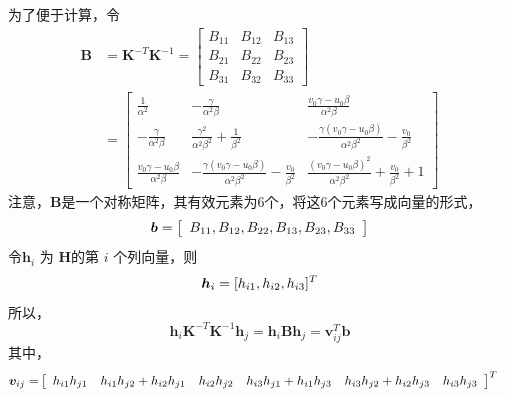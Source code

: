 为了便于计算，令
\begin{equation}
\label{eqn:2.55}
\begin{aligned}
\bm{B} &= \bm{K}^{-T}\bm{K}^{-1}
=\left[
\begin{array}{ccc}
B_{11} & B_{12} & B_{13} \\
B_{21} & B_{22} & B_{23} \\
B_{31} & B_{32} & B_{33}
\end{array}
\right]  \\
&=\left[
\begin{array}{ccc}
\frac{1}{\alpha^2} & -\frac{\gamma}{\alpha^2\beta} & \frac{v_0\gamma-u_0\beta}{\alpha^2\beta} \\
-\frac{\gamma}{\alpha^2\beta} & \frac{\gamma^2}{\alpha^2\beta^2}+\frac{1}{\beta^2} & -\frac{\gamma(v_0\gamma-u_0\beta)}{\alpha^2\beta^2}-\frac{v_0}{\beta^2} \\
\frac{v_0\gamma-u_0\beta}{\alpha^2\beta} & -\frac{\gamma(v_0\gamma-u_0\beta)}{\alpha^2\beta^2}-\frac{v_0}{\beta^2} & \frac{(v_0\gamma-u_0\beta)^2}{\alpha^2\beta^2}+\frac{v_0}{\beta^2}+1
\end{array}
\right]
\end{aligned}
\end{equation}
注意，$\bm{B}$是一个对称矩阵，其有效元素为6个，将这6个元素写成向量的形式，
\begin{equation}
\label{eqn:2.56}
\setlength{\abovedisplayskip}{6pt}
\setlength{\belowdisplayskip}{6pt}
\bm{b} =\left[\begin{array}{ccc}B_{11} ,B_{12} , B_{22},B_{13},B_{23},B_{33}\end{array}\right]
\end{equation}
令$\bm{h}_i $ 为 $\bm{H} $的第 $i$  个列向量，则 
\begin{equation}
\label{eqn:2.57}
\setlength{\abovedisplayskip}{6pt}
\setlength{\belowdisplayskip}{6pt}
\bm{h}_i = [h_{i1},h_{i2},h_{i3}]^T
\end{equation}
所以，
\begin{equation}
\label{eqn:2.58}
\bm{h}_i \bm{K}^{-T}\bm{K}^{-1} \bm{h}_j = \bm{h}_i \bm{B} \bm{h}_j = \bm{v}_{ij}^T \bm{b}
\end{equation}
其中，
\[
\setlength{\abovedisplayskip}{6pt}
\setlength{\belowdisplayskip}{6pt}
\begin{aligned}
\bm{v}_{ij} = 
& \left[ \begin{array}{cccccc} 
h_{i1}h_{j1} & h_{i1}h_{j2}+h_{i2}h_{j1} & h_{i2}h_{j2} & h_{i3}h_{j1}+h_{i1}h_{j3} & h_{i3}h_{j2}+h_{i2}h_{j3} & h_{i3}h_{j3} 
\end{array} \right]^T
\end{aligned}
\]
